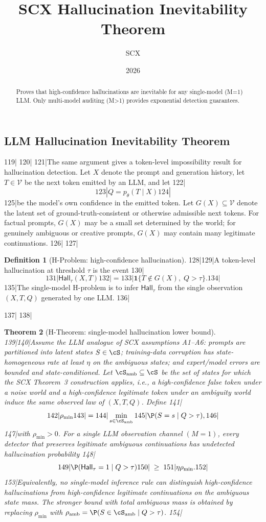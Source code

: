 \documentclass[11pt,a4paper]{article}
\title{SCX Hallucination Inevitability Theorem}
\author{SCX}
\date{2026}
\newtheorem{theorem}{Theorem}[section]
\theoremstyle{definition}
\newtheorem{definition}[theorem]{Definition}
\theoremstyle{remark}
\begin{document}
\maketitle
\begin{abstract}Proves that high-confidence hallucinations are inevitable for any single-model (M=1) LLM. Only multi-model auditing (M>1) provides exponential detection guarantees.\end{abstract}
\subsection{LLM Hallucination Inevitability Theorem}
119|\label{sec:llm_hallucination_inevitability}
120|
121|The same argument gives a token-level impossibility result for hallucination detection. Let $X$ denote the prompt and generation history, let $T \in \mathcal{V}$ be the next token emitted by an LLM, and let
122|\[
123|Q = p_\theta(T \mid X)
124|\]
125|be the model's own confidence in the emitted token. Let $G(X) \subseteq \mathcal{V}$ denote the latent set of ground-truth-consistent or otherwise admissible next tokens. For factual prompts, $G(X)$ may be a small set determined by the world; for genuinely ambiguous or creative prompts, $G(X)$ may contain many legitimate continuations.
126|
127|\begin{definition}[H-Problem: high-confidence hallucination]
128|\label{def:h_problem}
129|A token-level hallucination at threshold $\tau$ is the event
130|\[
131|\mathsf{Hall}_\tau(X,T)
132|=
133|\mathbf{1}\{T \notin G(X),\; Q > \tau\}.
134|\]
135|The single-model H-problem is to infer $\mathsf{Hall}_\tau$ from the single observation $(X,T,Q)$ generated by one LLM.
136|\end{definition}
137|
138|\begin{theorem}[H-Theorem: single-model hallucination lower bound]
139|\label{thm:h_theorem}
140|Assume the LLM analogue of SCX assumptions A1--A6: prompts are partitioned into latent states $S \in \cS$; training-data corruption has state-homogeneous rate at least $\eta$ on the ambiguous states; and expert/model errors are bounded and state-conditioned. Let $\cS_{\mathrm{amb}} \subseteq \cS$ be the set of states for which the SCX Theorem~3 construction applies, i.e., a high-confidence false token under a noise world and a high-confidence legitimate token under an ambiguity world induce the same observed law of $(X,T,Q)$. Define
141|\[
142|\rho_{\min}
143|=
144|\min_{s \in \cS_{\mathrm{amb}}}
145|\P(S=s \mid Q>\tau),
146|\]
147|with $\rho_{\min}>0$. For a single LLM observation channel $(M=1)$, every detector that preserves legitimate ambiguous continuations has undetected hallucination probability
148|\[
149|\P(\mathsf{Hall}_\tau=1 \mid Q>\tau)
150|\;\geq\;
151|\eta \rho_{\min}.
152|\]
153|Equivalently, no single-model inference rule can distinguish high-confidence hallucinations from high-confidence legitimate continuations on the ambiguous state mass. The stronger bound with total ambiguous mass is obtained by replacing $\rho_{\min}$ with $\rho_{\mathrm{amb}}=\P(S\in\cS_{\mathrm{amb}}\mid Q>\tau)$.
154|\end{theorem}
\end{document}
